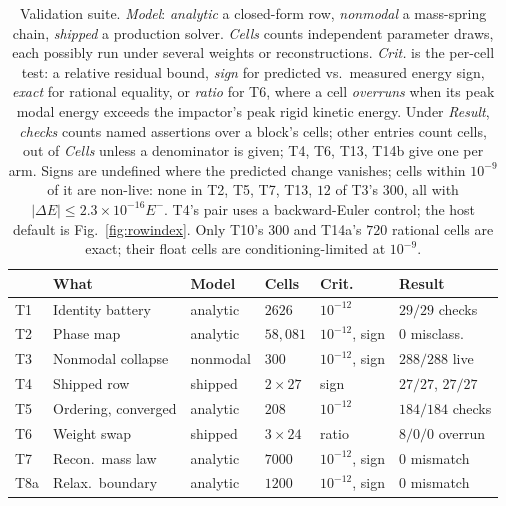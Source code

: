 \documentclass[sigconf,screen,review,anonymous]{acmart}
\theoremstyle{acmdefinition}
\begin{document}
\begin{table}[t]
\centering
\small
\captionsetup{font=small}
\caption{Validation suite. \emph{Model}: \emph{analytic} a
closed-form row, \emph{nonmodal} a mass-spring chain, \emph{shipped} a
production solver. \emph{Cells} counts independent parameter
draws, each possibly run under several weights or reconstructions.
\emph{Crit.} is the per-cell test: a relative residual bound, \emph{sign} for
predicted vs.\ measured energy sign, \emph{exact} for rational
equality, or \emph{ratio} for T6, where a cell \emph{overruns} when its peak
modal energy exceeds the impactor's peak rigid kinetic energy. Under
\emph{Result}, \emph{checks} counts named assertions over a block's cells;
other entries count cells, out of \emph{Cells} unless a denominator is given;
T4, T6, T13, T14b give one per arm. Signs are undefined where the predicted
change vanishes; cells within $10^{-9}$ of it are non-live: none
in T2, T5, T7, T13, $12$ of T3's $300$, all with
$|\Delta E| \le 2.3\times10^{-16}E^{-}$. T4's pair uses a backward-Euler
control; the host default is Fig.~\ref{fig:rowindex}. Only T10's $300$ and
T14a's $720$ rational cells are exact; their float cells are
conditioning-limited at $10^{-9}$.}
\label{tab:validation}
\setlength{\tabcolsep}{3pt}
\footnotesize
\begin{tabular}{@{}llllll@{}}
\toprule
 & What & Model & Cells & Crit. & Result \\
\midrule
T1 & Identity battery & analytic & $2626$ & $10^{-12}$ & $29/29$ checks \\
T2 & Phase map & analytic & $58{,}081$ & $10^{-12}$, sign & $0$ misclass. \\
T3 & Nonmodal collapse & nonmodal & $300$ & $10^{-12}$, sign & $288/288$ live \\
T4 & Shipped row & shipped & $2{\times}27$ & sign & $27/27$, $27/27$ \\
T5 & Ordering, converged & analytic & $208$ & $10^{-12}$ & $184/184$ checks \\
T6 & Weight swap & shipped & $3{\times}24$ & ratio & $8/0/0$ overrun \\
T7 & Recon.\ mass law & analytic & $7000$ & $10^{-12}$, sign & $0$ mismatch \\
T8a & Relax.\ boundary & analytic & $1200$ & $10^{-12}$, sign & $0$ mismatch \\

\end{tabular}
\end{table}
\end{document}
